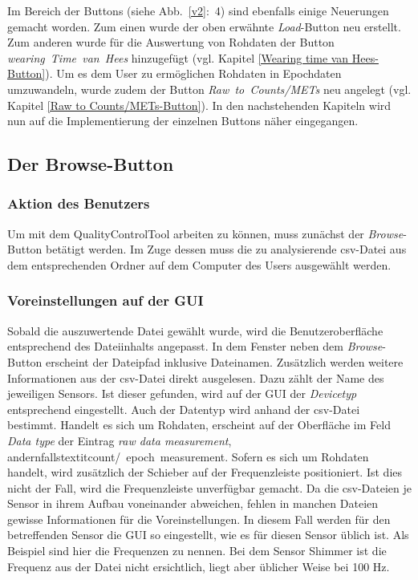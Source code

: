 \documentclass[onecolumn,german]{article}
\begin{document}
Im Bereich der Buttons (siehe Abb.~\ref{v2}:~4) sind ebenfalls einige Neuerungen gemacht worden. Zum einen wurde der oben erwähnte \textit{Load}-Button neu erstellt. Zum anderen wurde für die Auswertung von Rohdaten der Button \mbox{\textit{wearing Time van Hees}} hinzugefügt (vgl. Kapitel \ref{Wearing time van Hees-Button}). Um es dem User zu ermöglichen Rohdaten in Epochdaten umzuwandeln, wurde zudem der Button \mbox{\textit{Raw to Counts/METs}} neu angelegt (vgl. Kapitel \ref{Raw to Counts/METs-Button}). In den nachstehenden Kapiteln wird nun auf die Implementierung der einzelnen Buttons näher eingegangen.
\newpage

\subsection{Der Browse-Button}\label{Der Browse-Button}
\subsubsection{Aktion des Benutzers}
Um mit dem QualityControlTool arbeiten zu können, muss zunächst der \mbox{\textit{Browse}-Button} betätigt werden. Im Zuge dessen muss die zu analysierende \mbox{csv-Datei} aus dem entsprechenden Ordner auf dem Computer des Users ausgewählt werden. 

\subsubsection{Voreinstellungen auf der GUI}
Sobald die auszuwertende Datei gewählt wurde, wird die Benutzeroberfläche entsprechend des Dateiinhalts angepasst. In dem Fenster neben dem \mbox{\textit{Browse}-Button} erscheint der Dateipfad inklusive Dateinamen. Zusätzlich werden weitere Informationen aus der csv-Datei direkt ausgelesen. Dazu zählt der Name des jeweiligen Sensors. Ist dieser gefunden, wird auf der GUI der \textit{Devicetyp} entsprechend eingestellt. Auch der Datentyp wird anhand der csv-Datei bestimmt. Handelt es sich um Rohdaten, erscheint auf der Oberfläche im Feld \textit{Data type} der Eintrag \textit{raw data measurement}, andernfalls\mbox{textit{count/ epoch measurement}}. Sofern es sich um Rohdaten handelt, wird zusätzlich der Schieber auf der Frequenzleiste positioniert. Ist dies nicht der Fall, wird die Frequenzleiste unverfügbar gemacht.\newline
Da die csv-Dateien je Sensor in ihrem Aufbau voneinander abweichen, fehlen in manchen Dateien gewisse Informationen für die Voreinstellungen. In diesem Fall werden für den betreffenden Sensor die GUI so eingestellt, wie es für diesen Sensor üblich ist. Als Beispiel sind hier die Frequenzen zu nennen. Bei dem Sensor Shimmer ist die Frequenz aus der Datei nicht ersichtlich, liegt aber üblicher Weise bei 100 Hz.\newline
\end{document}
